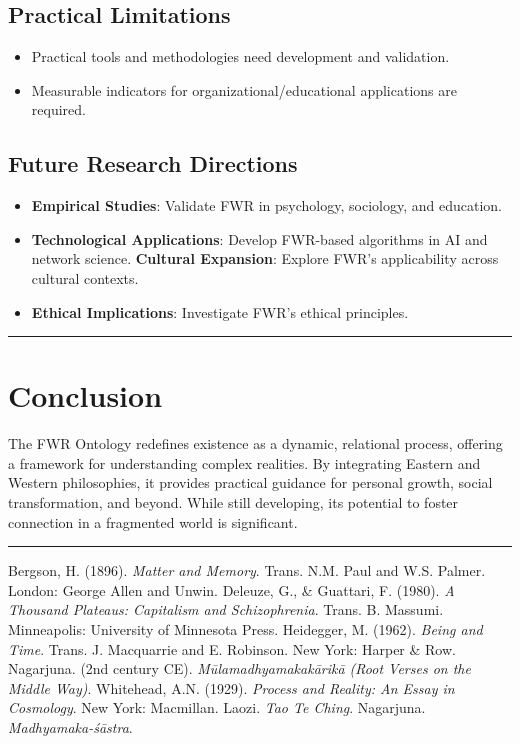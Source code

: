 \documentclass{article}
\begin{document}
\subsection{Practical Limitations}
\begin{itemize}
    \item Practical tools and methodologies need development and validation.
    \item Measurable indicators for organizational/educational applications are required.
\end{itemize}

\subsection{Future Research Directions}
\begin{itemize}
    \item \textbf{Empirical Studies}: Validate FWR in psychology, sociology, and education.
    \item \textbf{Technological Applications}: Develop FWR-based algorithms in AI and network science.
    \textbf{Cultural Expansion}: Explore FWR’s applicability across cultural contexts.
    \item \textbf{Ethical Implications}: Investigate FWR’s ethical principles.
\end{itemize}

\hrule

\section{Conclusion}
The FWR Ontology redefines existence as a dynamic, relational process, offering a framework for understanding complex realities. By integrating Eastern and Western philosophies, it provides practical guidance for personal growth, social transformation, and beyond. While still developing, its potential to foster connection in a fragmented world is significant.

\hrule

\begin{thebibliography}{99}
 Bergson, H. (1896). \textit{Matter and Memory}. Trans. N.M. Paul and W.S. Palmer. London: George Allen and Unwin.
 Deleuze, G., \& Guattari, F. (1980). \textit{A Thousand Plateaus: Capitalism and Schizophrenia}. Trans. B. Massumi. Minneapolis: University of Minnesota Press.
 Heidegger, M. (1962). \textit{Being and Time}. Trans. J. Macquarrie and E. Robinson. New York: Harper \& Row.
 Nagarjuna. (2nd century CE). \textit{Mūlamadhyamakakārikā (Root Verses on the Middle Way)}.
 Whitehead, A.N. (1929). \textit{Process and Reality: An Essay in Cosmology}. New York: Macmillan.
 Laozi. \textit{Tao Te Ching}.
 Nagarjuna. \textit{Madhyamaka-śāstra}.
\end{thebibliography}
\end{document}
